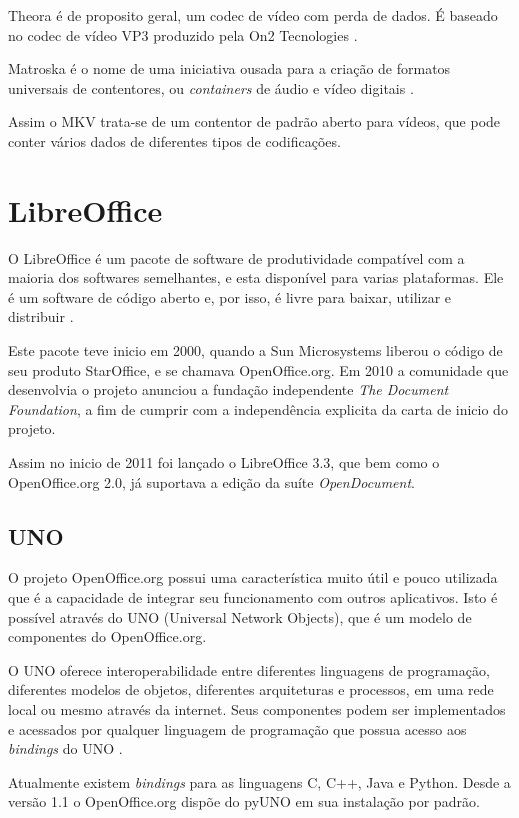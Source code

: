 Theora é de proposito geral, um codec de vídeo com perda de dados. É baseado no codec de vídeo VP3 produzido pela On2 Tecnologies \cite{XIPH-FOUNDATION}.

Matroska é o nome de uma iniciativa ousada para a criação de formatos universais de contentores, ou \textit{containers} de áudio e vídeo digitais \cite{WIKIPEDIA}.

Assim o MKV trata-se de um contentor de padrão aberto para vídeos, que pode conter vários dados de diferentes tipos de codificações.

\section{LibreOffice}

O LibreOffice é um pacote de software de produtividade compatível com a maioria dos softwares semelhantes, e esta disponível para varias plataformas. Ele é um software de código aberto e, por isso, é livre para baixar, utilizar e distribuir \cite{LibreOffice}.

Este pacote teve inicio em 2000, quando a Sun Microsystems liberou o código de seu produto StarOffice, e se chamava OpenOffice.org. Em 2010 a comunidade que desenvolvia o projeto anunciou a fundação independente \textit{The Document Foundation}, a fim de cumprir com a independência explicita da carta de inicio do projeto.

Assim no inicio de 2011 foi lançado o LibreOffice 3.3, que bem como o OpenOffice.org 2.0, já suportava a edição da suíte \textit{OpenDocument}.

\subsection{UNO}

O projeto OpenOffice.org possui uma característica muito útil e pouco utilizada que é a capacidade de integrar seu funcionamento com outros aplicativos. Isto é possível através do UNO (Universal Network Objects), que é um modelo de componentes do OpenOffice.org.

O UNO oferece interoperabilidade entre diferentes linguagens de programação, diferentes modelos de objetos, diferentes arquiteturas e processos, em uma rede local ou mesmo através da internet. Seus componentes podem ser implementados e acessados por qualquer linguagem de programação que possua acesso aos \textit{bindings} do UNO \cite{MINETTO-PYUNO}.

Atualmente existem \textit{bindings} para as linguagens C, C++, Java e Python. Desde a versão 1.1 o OpenOffice.org dispõe do pyUNO em sua instalação por padrão.

